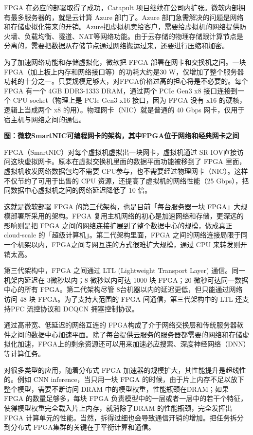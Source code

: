 FPGA 在必应的部署取得了成功，Catapult 项目继续在公司内扩张。微软内部拥有最多服务器的，就是云计算 Azure 部门了。Azure 部门急需解决的问题是网络和存储虚拟化带来的开销。Azure把虚拟机卖给客户，需要给虚拟机的网络提供防火墙、负载均衡、隧道、NAT等网络功能。由于云存储的物理存储跟计算节点是分离的，需要把数据从存储节点通过网络搬运过来，还要进行压缩和加密。

为了加速网络功能和存储虚拟化，微软把 FPGA 部署在网卡和交换机之间。一块 FPGA（加上板上内存和网络接口等）的功耗大约是30 W，仅增加了整个服务器功耗的十分之一。只要规模足够大，对FPGA价格过高的担心将是不必要的。每个 FPGA 有一个 4GB DDR3-1333 DRAM，通过两个 PCIe Gen3 x8 接口连接到一个 CPU socket（物理上是 PCIe Gen3 x16 接口，因为 FPGA 没有 x16 的硬核，逻辑上当成两个 x8 的用）。物理网卡（NIC）就是普通的 40 Gbps 网卡，仅用于宿主机与网络之间的通信。


\textbf{图：微软SmartNIC可编程网卡的架构，其中FPGA位于网络和经典网卡之间}

FPGA（SmartNIC）对每个虚拟机虚拟出一块网卡，虚拟机通过 SR-IOV直接访问这块虚拟网卡。原本在虚拟交换机里面的数据平面功能被移到了 FPGA 里面，虚拟机收发网络数据包均不需要 CPU参与，也不需要经过物理网卡（NIC）。这样不仅节约了可用于出售的 CPU 资源，还提高了虚拟机的网络性能（25 Gbps），把同数据中心虚拟机之间的网络延迟降低了 10 倍。

这就是微软部署 FPGA 的第三代架构，也是目前「每台服务器一块 FPGA」大规模部署所采用的架构。FPGA 复用主机网络的初心是加速网络和存储，更深远的影响则是把 FPGA 之间的网络连接扩展到了整个数据中心的规模，做成真正 cloud-scale 的「超级计算机」。第二代架构里面，FPGA 之间的网络连接局限于同一个机架以内，FPGA之间专网互连的方式很难扩大规模，通过 CPU 来转发则开销太高。

第三代架构中，FPGA 之间通过 LTL (Lightweight Transport Layer) 通信。同一机架内延迟在 3微秒以内；8 微秒以内可达 1000 块 FPGA；20 微秒可达同一数据中心的所有 FPGA。第二代架构尽管 8台机器以内的延迟更低，但只能通过网络访问 48 块 FPGA。为了支持大范围的 FPGA 间通信，第三代架构中的 LTL 还支持PFC 流控协议和 DCQCN 拥塞控制协议。

通过高带宽、低延迟的网络互连的 FPGA构成了介于网络交换层和传统服务器软件之间的数据中心加速平面。除了每台提供云服务的服务器都需要的网络和存储虚拟化加速，FPGA上的剩余资源还可以用来加速必应搜索、深度神经网络（DNN）等计算任务。

对很多类型的应用，随着分布式 FPGA 加速器的规模扩大，其性能提升是超线性的。例如 CNN inference，当只用一块 FPGA 的时候，由于片上内存不足以放下整个模型，需要不断访问 DRAM 中的模型权重，性能瓶颈在DRAM；如果 FPGA 的数量足够多，每块 FPGA 负责模型中的一层或者一层中的若干个特征，使得模型权重完全载入片上内存，就消除了DRAM 的性能瓶颈，完全发挥出 FPGA 计算单元的性能。当然，拆得过细也会导致通信开销的增加。把任务拆分到分布式 FPGA集群的关键在于平衡计算和通信。

